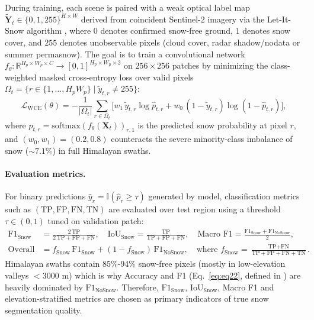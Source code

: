 \documentclass{article}
\begin{document}
During training, each scene is paired with a weak optical label map $\tilde{\mathbf{Y}}_t \in \{0, 1, 255\}^{H \times W}$ derived from coincident Sentinel-2 imagery via the Let-It-Snow algorithm \citep{simon2018algorithm}, where $0$ denotes confirmed snow-free ground, $1$ denotes snow cover, and $255$ denotes unobservable pixels (cloud cover, radar shadow/nodata or summer permasnow). The goal is to train a convolutional network $f_\theta : \mathbb{R}^{H_p \times W_p \times C} \rightarrow [0, 1]^{H_p \times W_p \times 2}$ on $256 \times 256$ patches by minimizing the class-weighted masked cross-entropy loss over valid pixels $\Omega_t = \{r \in \{1, \dots, H_p W_p\} \mid \tilde{y}_{t,r} \neq 255\}$:
\begin{equation}
  \mathcal{L}_{\text{WCE}}(\theta) = -\frac{1}{|\Omega_t|} \sum_{r \in \Omega_t} \Big[ w_1 \, \tilde{y}_{t,r} \log \hat{p}_{t,r} + w_0 \, (1 - \tilde{y}_{t,r}) \log (1 - \hat{p}_{t,r}) \Big],
  \label{eq:wce}
\end{equation}
where $\hat{p}_{t,r} = \text{softmax}(f_\theta(\mathbf{X}_t))_{r,1}$ is the predicted snow probability at pixel $r$, and $(w_0, w_1) = (0.2, 0.8)$ counteracts the severe minority-class imbalance of snow ($\sim 7.1\%$) in full Himalayan swaths.

\paragraph{Evaluation metrics.}
For binary predictions $\hat{y}_r = \mathbb{I}(\hat{p}_r \ge \tau)$ generated by model, classification metrics such as $(\text{TP}, \text{FP}, \text{FN}, \text{TN})$ are evaluated over test region using a threshold $\tau \in (0, 1)$ tuned on validation patch:
\begin{align}
  \text{F1}_{\text{Snow}} &= \frac{2\,\text{TP}}{2\,\text{TP} + \text{FP} + \text{FN}}, \quad
  \text{IoU}_{\text{Snow}} = \frac{\text{TP}}{\text{TP} + \text{FP} + \text{FN}}, \quad
  \text{Macro F1} = \frac{\text{F1}_{\text{Snow}} + \text{F1}_{\text{NoSnow}}}{2}, \label{eq:metrics1} \\
  \text{Overall F1} &= f_{\text{Snow}}\,\text{F1}_{\text{Snow}} + (1 - f_{\text{Snow}})\,\text{F1}_{\text{NoSnow}}, \quad \text{where } f_{\text{Snow}} = \frac{\text{TP} + \text{FN}}{\text{TP} + \text{FP} + \text{FN} + \text{TN}}. \label{eq:eq22}
\end{align}
Himalayan swaths contain 85\%-94\% snow-free pixels (mostly in low-elevation valleys $<3000\text{ m}$) which is why Accuracy and F1 (Eq.~\ref{eq:eq22}, defined in \citealp{briand2026weakly}) are heavily dominated by $\text{F1}_{\text{NoSnow}}$. Therefore, $\text{F1}_{\text{Snow}}$, $\text{IoU}_{\text{Snow}}$, Macro F1 and elevation-stratified metrics are chosen as  primary indicators of true snow segmentation quality.
\end{document}
